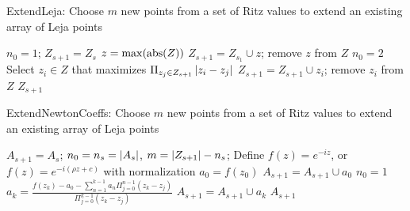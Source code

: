 \begin{algorithm}
  \caption{{\sc ExtendLeja:}
  Choose $m$ new points from a set of Ritz values to extend an existing array of
  Leja points
  \label{al:ExtendLeja}
  }
  \begin{algorithmic}[1]

    \Statex


    \Statex

      \State $n_0 = 1$; $Z_{s+1} = Z_{s}$
        \State $z = \max(\operatorname{abs}(Z))$
        \State $Z_{s+1} = Z_{s_{1}} \cup z$; remove $z$ from $Z$
        \State $n_0 = 2$
      \EndIf
        \State Select $z_i \in Z$ that maximizes
               $\Pi_{z_j \in Z_{s+1}} \left|z_i - z_j\right|$
        \State $Z_{s+1} = Z_{s+1} \cup z_i$; remove $z_i$ from $Z$
      \EndFor
      \State \Return $Z_{s+1}$
    \EndProcedure
  \end{algorithmic}
\end{algorithm}

\begin{algorithm}
  \caption{{\sc ExtendNewtonCoeffs:}
  Choose $m$ new points from a set of Ritz values to extend an existing array of
  Leja points
  \label{al:ExtendNewtonCoeffs}
  }
  \begin{algorithmic}[1]

    \Statex


    \Statex
      \State $A_{s+1} = A_{s}$;
             $n_0 = n_s = \left|A_{s}\right|$,
             $m = \left|Z_{s+1}\right| - n_s$;
      \State Define $f(z) = e^{-i z}$, or
                    $f(z) = e^{-i (\rho z + c)}$ with normalization
        \State $a_{0} = f(z_0)$
        \State $A_{s+1} = A_{s+1} \cup a_{0}$
        \State $n_0 = 1$
      \EndIf
        \State $a_k = \frac{f(z_k) - a_0 - \sum_{n=1}^{k-1} a_{n} \Pi_{j=0}^{n-1} (z_k - z_j)}
                           {\Pi_{j=0}^{k-1} (z_k - z_j)}$
        \State $A_{s+1} = A_{s+1} \cup a_k$
      \EndFor
      \State \Return $A_{s+1}$
    \EndProcedure
  \end{algorithmic}
\end{algorithm}

